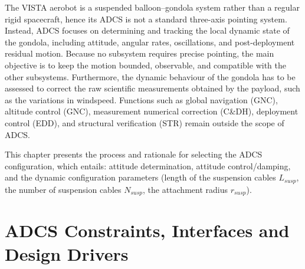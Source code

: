 

The VISTA aerobot is a suspended balloon–gondola system rather than a regular rigid spacecraft, hence its ADCS is not a standard three-axis pointing system. Instead, ADCS focuses on determining and tracking the local dynamic state of the gondola, including attitude, angular rates, oscillations, and post-deployment residual motion. Because no subsystem requires precise pointing, the main objective is to keep the motion bounded, observable, and compatible with the other subsystems. Furthermore, the dynamic behaviour of the gondola has to be assessed to correct the raw scientific measurements obtained by the payload, such as the variations in windspeed. Functions such as global navigation (GNC), altitude control (GNC), measurement numerical correction (C\&DH), deployment control (EDD), and structural verification (STR) remain outside the scope of ADCS. 

This chapter presents the process and rationale for selecting the ADCS configuration, which entails: attitude determination, attitude control/damping, and the dynamic configuration parameters (length of the suspension cables $L_{susp}$, the number of suspension cables $N_{susp}$, the attachment radius $r_{susp}$).

\section{ADCS Constraints, Interfaces and Design Drivers}
\label{sec: ADCS constraints, interfaces and design drivers}

